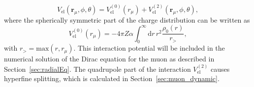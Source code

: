 \begin{equation}
\label{eq:quadInt}
V_{\text{el}}(\mathbf{r}_\mu,\phi,\theta) = V^{(0)}_{\text{el}}(r_\mu) + V^{(2)}_{\text{el}}(\mathbf{r}_\mu,\phi,\theta),
\end{equation}
where the spherically symmetric part of the charge distribution can be written as
\begin{equation}
\label{eq:Hmonopole}
V^{(0)}_{\text{el}}(r_\mu)= - 4 \pi Z\alpha \int_0^\infty \mathrm{d}r \, r^2 \frac{\rho_0(r)}{r_>},
\end{equation}
with $r_>=\text{max}(r,r_\mu)$. This interaction potential will be included in the numerical solution of the Dirac equation for the muon as described in Section~\ref{sec:radialEq}. The quadrupole part of the interaction $V^{(2)}_{\text{el}}$ causes hyperfine splitting, which is calculated in Section~\ref{sec:muon_dynamic}.\\

